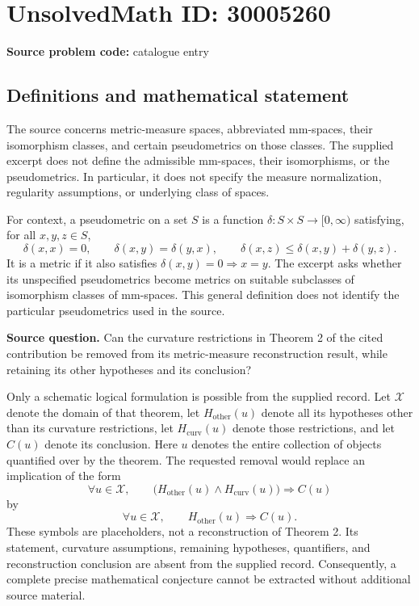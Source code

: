 \documentclass[11pt]{article}
\begin{document}
\section*{UnsolvedMath ID: 30005260}
\textbf{Source problem code:} catalogue entry
\subsection{Definitions and mathematical statement}
The source concerns metric-measure spaces, abbreviated mm-spaces, their isomorphism classes, and certain pseudometrics on those classes. The supplied excerpt does not define the admissible mm-spaces, their isomorphisms, or the pseudometrics. In particular, it does not specify the measure normalization, regularity assumptions, or underlying class of spaces.

For context, a pseudometric on a set \(S\) is a function \(\delta:S\times S\to[0,\infty)\) satisfying, for all \(x,y,z\in S\),
\[
\delta(x,x)=0,\qquad \delta(x,y)=\delta(y,x),\qquad \delta(x,z)\leq\delta(x,y)+\delta(y,z).
\]
It is a metric if it also satisfies \(\delta(x,y)=0\Rightarrow x=y\). The excerpt asks whether its unspecified pseudometrics become metrics on suitable subclasses of isomorphism classes of mm-spaces. This general definition does not identify the particular pseudometrics used in the source.

\textbf{Source question.} Can the curvature restrictions in Theorem 2 of the cited contribution be removed from its metric-measure reconstruction result, while retaining its other hypotheses and its conclusion?

Only a schematic logical formulation is possible from the supplied record. Let \(\mathcal X\) denote the domain of that theorem, let \(H_{\mathrm{other}}(u)\) denote all its hypotheses other than its curvature restrictions, let \(H_{\mathrm{curv}}(u)\) denote those restrictions, and let \(C(u)\) denote its conclusion. Here \(u\) denotes the entire collection of objects quantified over by the theorem. The requested removal would replace an implication of the form
\[
\forall u\in\mathcal X,\qquad
\bigl(H_{\mathrm{other}}(u)\land H_{\mathrm{curv}}(u)\bigr)\Longrightarrow C(u)
\]
by
\[
\forall u\in\mathcal X,\qquad H_{\mathrm{other}}(u)\Longrightarrow C(u).
\]
These symbols are placeholders, not a reconstruction of Theorem 2. Its statement, curvature assumptions, remaining hypotheses, quantifiers, and reconstruction conclusion are absent from the supplied record. Consequently, a complete precise mathematical conjecture cannot be extracted without additional source material.
\end{document}
